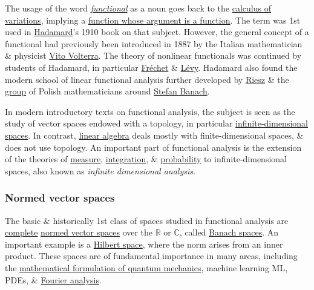\documentclass{article}
\begin{document}
The usage of the word \href{https://en.wikipedia.org/wiki/Functional_(mathematics)}{\it functional} as a noun goes back to the \href{https://en.wikipedia.org/wiki/Calculus_of_variations}{calculus of variations}, implying a \href{https://en.wikipedia.org/wiki/Higher-order_function}{function whose argument is a function}. The term was 1st used in \href{https://en.wikipedia.org/wiki/Jacques_Hadamard}{\sc Hadamard}'s 1910 book on that subject. However, the general concept of a functional had previously been introduced in 1887 by the Italian mathematician \& physicist \href{https://en.wikipedia.org/wiki/Vito_Volterra}{\sc Vito Volterra}. The theory of nonlinear functionals was continued by students of {\sc Hadamard}, in particular \href{https://en.wikipedia.org/wiki/Ren%C3%A9_Maurice_Fr%C3%A9chet}{\sc Fr\'echet} \& \href{https://en.wikipedia.org/wiki/Paul_L%C3%A9vy_(mathematician)}{\sc L\'evy}. {\sc Hadamard} also found the modern school of linear functional analysis further developed by \href{https://en.wikipedia.org/wiki/Frigyes_Riesz}{\sc Riesz} \& the \href{https://en.wikipedia.org/wiki/Lw%C3%B3w_School_of_Mathematics}{group} of Polish mathematicians around \href{https://en.wikipedia.org/wiki/Stefan_Banach}{\sc Stefan Banach}.

In modern introductory texts on functional analysis, the subject is seen as the study of vector spaces endowed with a topology, in particular \href{https://en.wikipedia.org/wiki/Dimension_(vector_space)}{infinite-dimensional spaces}. In contrast, \href{https://en.wikipedia.org/wiki/Linear_algebra}{linear algebra} deals mostly with finite-dimensional spaces, \& does not use topology. An important part of functional analysis is the extension of the theories of \href{https://en.wikipedia.org/wiki/Measure_(mathematics)}{measure}, \href{https://en.wikipedia.org/wiki/Integral}{integration}, \& \href{https://en.wikipedia.org/wiki/Probability}{probability} to infinite-dimensional spaces, also known as {\it infinite dimensional analysis}.

\subsubsection{Normed vector spaces}
The basic \& historically 1st class of spaces studied in functional analysis are \href{https://en.wikipedia.org/wiki/Complete_space}{complete} \href{https://en.wikipedia.org/wiki/Normed_vector_space}{normed vector spaces} over the $\mathbb{R}$ or $\mathbb{C}$, called \href{https://en.wikipedia.org/wiki/Banach_space}{Banach spaces}. An important example is a \href{https://en.wikipedia.org/wiki/Hilbert_space}{Hilbert space}, where the norm arises from an inner product. These spaces are of fundamental importance in many areas, including the \href{https://en.wikipedia.org/wiki/Mathematical_formulation_of_quantum_mechanics}{mathematical formulation of quantum mechanics}, machine learning ML, PDEs, \& \href{https://en.wikipedia.org/wiki/Fourier_analysis}{Fourier analysis}.
\end{document}
